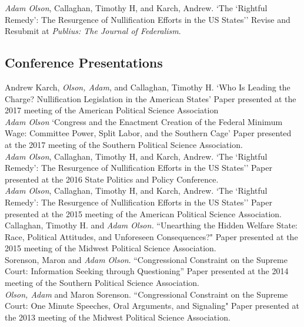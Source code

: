 \documentclass[12pt, letter]{article}
\newcommand{\years}[1]{\marginnote{\normalsize #1}}
\begin{document}
\emph{Adam Olson}, Callaghan, Timothy H, and Karch, Andrew. `The `Rightful Remedy': The Resurgence of Nullification Efforts in the US States'' Revise and Resubmit at \textit{Publius: The Journal of Federalism}.\\

\subsection*{Conference Presentations}
\noindent
\years{2017}Andrew Karch, \textit{Olson, Adam}, and Callaghan, Timothy H. `Who Is Leading the Charge? Nullification Legislation in the American States' Paper presented at the 2017 meeting of the American Political Science Association\\

\emph{Adam Olson} `Congress and the Enactment Creation of the Federal Minimum Wage: Committee Power, Split Labor, and the Southern Cage' Paper presented at the 2017 meeting of the Southern Political Science Association. \\

\years{2016}\emph{Adam Olson}, Callaghan, Timothy H, and Karch, Andrew. `The `Rightful Remedy': The Resurgence of Nullification Efforts in the US States'' Paper presented at the 2016 State Politics and Policy Conference.\\

\years{2015}\emph{Adam Olson}, Callaghan, Timothy H, and Karch, Andrew. `The `Rightful Remedy': The Resurgence of Nullification Efforts in the US States'' Paper presented at the 2015 meeting of the American Political Science Association.\\

Callaghan, Timothy H. and \emph{Adam Olson.} ``Unearthing the Hidden Welfare State: Race, Political Attitudes, and Unforeseen Consequences?" Paper presented at the 2015 meeting of the Midwest Political Science Association.\\

\years{2014}Sorenson, Maron and \emph{Adam Olson}. ``Congressional Constraint on the Supreme Court: Information Seeking through Questioning'' Paper presented at the 2014 meeting of the Southern Political Science Association.\\

\years{2013}\emph{Olson, Adam} and Maron Sorenson. ``Congressional Constraint on the Supreme Court: One Minute Speeches, Oral Arguments, and Signaling" Paper presented at the 2013 meeting of the Midwest Political Science Association.
\end{document}

